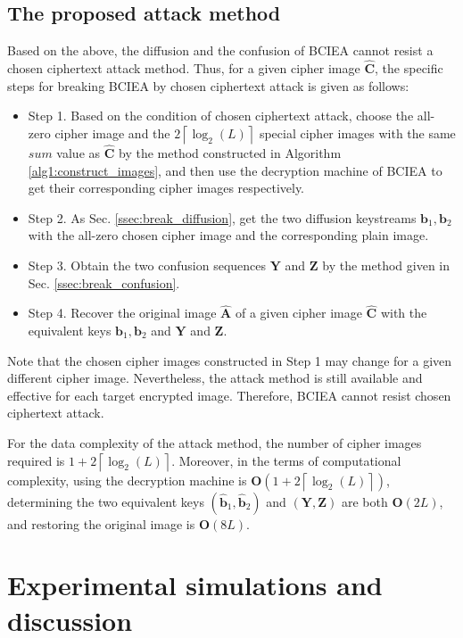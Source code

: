 \documentclass[final,3p,times,twocolumn]{elsarticle}
\begin{document}
\subsection{The proposed attack method}
\label{ssec:break_BCIEA}

Based on the above, the diffusion and the confusion of BCIEA cannot resist a chosen ciphertext attack method. Thus, for a given cipher image $\bm{\hat{C}}$, the specific steps for breaking BCIEA by chosen ciphertext attack is given as follows:
\begin{itemize}
	\item Step 1. Based on the condition of chosen ciphertext attack, choose the all-zero cipher image and the $2 \left\lceil {\log_{2}(L)} \right\rceil$ special cipher images with the same $sum$ value as $\bm{\hat{C}}$ by the method constructed in Algorithm \ref{alg1:construct_images}, and then use the decryption machine of BCIEA to get their corresponding cipher images respectively.
	
	\item Step 2. As Sec. \ref{ssec:break_diffusion}, get the two diffusion keystreams $\bm{{b}}_1,\bm{{b}}_2$ with the all-zero chosen cipher image and the corresponding plain image. 

	\item Step 3. Obtain the two confusion sequences $\bm{Y}$ and $\bm{Z}$ by the method given in Sec. \ref{ssec:break_confusion}.
	
	\item Step 4. Recover the original image $\bm{\hat{A}}$ of a given cipher image $\bm{\hat{C}}$ with the equivalent keys $\bm{{b}}_1,\bm{{b}}_2$ and $\bm{Y}$ and $\bm{Z}$. 

\end{itemize}

Note that the chosen cipher images constructed in Step 1 may change for a given different cipher image. Nevertheless, the attack method is still available and effective for each target encrypted image. Therefore, BCIEA cannot resist chosen ciphertext attack. 

For the data complexity of the attack method, the number of cipher images required is $1+2 \left\lceil {\log_{2}(L)} \right\rceil$.
Moreover, in the terms of computational complexity, using the decryption machine is $\bm{O}(1+2 \left\lceil {\log_{2}(L)} \right\rceil)$, determining the two equivalent keys $(\bm{\hat{b}}_1,\bm{\hat{b}}_2)$ and $(\bm{Y},\bm{Z})$ are both $\bm{O}(2L)$, and restoring the original image is $\bm{O}(8L)$.
%
\section{Experimental simulations and discussion}
\label{sec4:Experiments}
%
\end{document}
